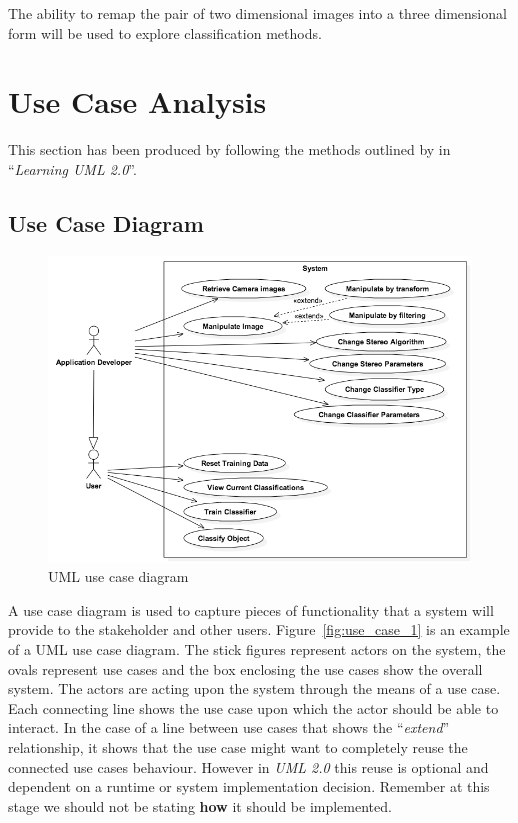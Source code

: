 \documentclass[11pt,oneside]{report}
\begin{document}
			The ability to remap the pair of two dimensional images into a three dimensional form will be used to explore classification methods.
			
		\section{Use Case Analysis}
		This section has been produced by following the methods outlined by  in ``\textit{Learning UML 2.0}''.
			\subsection{Use Case Diagram}
			
			\begin{figure}
			\centering
    				\includegraphics[width=\textwidth]{use_case_1}
    			\caption{UML use case diagram \protect {\label{fig:use_case_1}}}

			\end{figure}	
			A use case diagram is used to capture pieces of functionality that a system will provide to the stakeholder and other users.
			Figure~\ref{fig:use_case_1} is an example of a UML use case diagram.
			The stick figures represent actors on the system, the ovals represent use cases and the box enclosing the use cases show the overall system. 
			The actors are acting upon the system through the means of a use case.
			Each connecting line shows the use case upon which the actor should be able to interact.
			In the case of a line between use cases that shows the ``\textit{extend}'' relationship, it shows that the use case might want to completely reuse the connected use cases behaviour.
			However in \textit{UML 2.0} this reuse is optional and dependent on a runtime or system implementation decision.
			Remember at this stage we should not be stating \textbf{how} it should be implemented.
\end{document}
